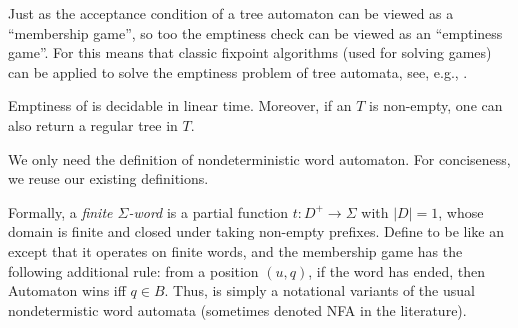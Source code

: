  
Just as the acceptance condition of a tree automaton can be viewed as a ``membership game'', so too the emptiness check can be viewed as an ``emptiness game''. For \NFT this means that classic fixpoint algorithms (used for solving games) can be applied to solve the emptiness problem of tree automata, see, e.g., \cite{DBLP:conf/dagstuhl/2001automata}. 

\begin{fact} \label{fact:nft-emptiness}
Emptiness of \NFT is decidable in linear time. Moreover, if an \NFT $T$ is non-empty, one can also return a regular tree in $T$. 
\end{fact}

 We only need the definition of nondeterministic word automaton. For conciseness, we reuse our existing definitions.



Formally, a \emph{finite $\Sigma$-word} is a partial function $t:D^+ \to \Sigma$ with $|D| = 1$, whose domain 
is finite and closed under taking non-empty prefixes. Define \NFWf to be like an \NFT except that it operates on finite words, 
and the membership game has the following additional rule:  from a position $(u,q)$, if the word has ended, then Automaton wins iff $q \in B$. 
Thus, \NFWf is simply a notational variants of the usual nondetermistic word automata (sometimes denoted NFA in the literature).

